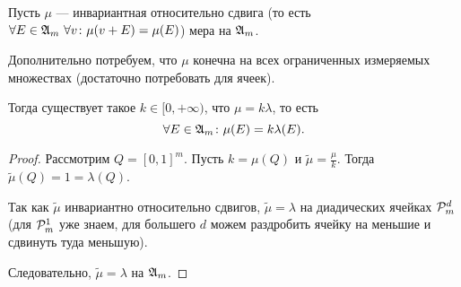 \begin{thm}
	Пусть $ \mu$ --- инвариантная относительно сдвига (то есть $ \forall E \in \A_{m} ~ \forall v \colon \mu(v + E) = \mu(E)$) мера на  $ \A_{m}$.

	Дополнительно потребуем, что $ \mu$ конечна на всех ограниченных измеряемых множествах (достаточно потребовать для ячеек).

	Тогда существует такое $ k \in [0, +\infty)$, что $ \mu = k \lambda $, то есть 
	\[
		\forall E \in \A_m \colon \mu(E) = k \lambda (E)
	.\] 
\end{thm}
\begin{proof}
	Рассмотрим $ Q = [0, 1]^{m}$. Пусть $ k = \mu(Q)$ и $ \widetilde{ \mu} = \frac{\mu}{k}$.
	Тогда $ \widetilde{ \mu} (Q) = 1 = \lambda (Q)$. 

	Так как $ \widetilde{ \mu} $ инвариантно относительно сдвигов, $ \widetilde{ \mu}  = \lambda $ на диадических ячейках $ \P_{m}^{d}$ (для $ \P_{m}^{1}$ уже знаем, для большего $ d$ можем раздробить ячейку на меньшие и сдвинуть туда меньшую).

	Следовательно, $ \widetilde{ \mu}  = \lambda $ на $ \A_m$.
\end{proof}


